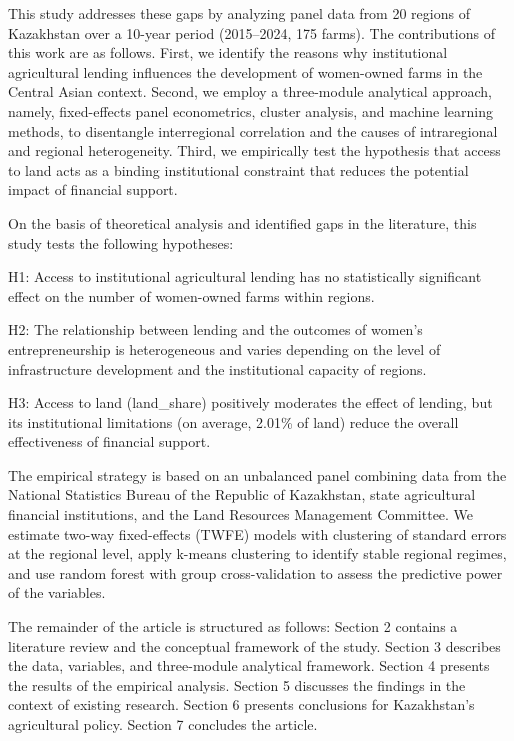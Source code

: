 \documentclass[
]{article}
\begin{document}
This study addresses these gaps by analyzing panel data from 20 regions
of Kazakhstan over a 10-year period (2015--2024, 175 farms). The
contributions of this work are as follows. First, we identify the
reasons why institutional agricultural lending influences the
development of women-owned farms in the Central Asian context. Second,
we employ a three-module analytical approach, namely, fixed-effects
panel econometrics, cluster analysis, and machine learning methods, to
disentangle interregional correlation and the causes of intraregional
and regional heterogeneity. Third, we empirically test the hypothesis
that access to land acts as a binding institutional constraint that
reduces the potential impact of financial support.

On the basis of theoretical analysis and identified gaps in the
literature, this study tests the following hypotheses:

H1: Access to institutional agricultural lending has no statistically
significant effect on the number of women-owned farms within regions.

H2: The relationship between lending and the outcomes of women's
entrepreneurship is heterogeneous and varies depending on the level of
infrastructure development and the institutional capacity of regions.

H3: Access to land (land\_share) positively moderates the effect of
lending, but its institutional limitations (on average, 2.01\% of land)
reduce the overall effectiveness of financial support.

The empirical strategy is based on an unbalanced panel combining data
from the National Statistics Bureau of the Republic of Kazakhstan, state
agricultural financial institutions, and the Land Resources Management
Committee. We estimate two-way fixed-effects (TWFE) models with
clustering of standard errors at the regional level, apply k-means
clustering to identify stable regional regimes, and use random forest
with group cross-validation to assess the predictive power of the
variables.

The remainder of the article is structured as follows: Section 2
contains a literature review and the conceptual framework of the study.
Section 3 describes the data, variables, and three-module analytical
framework. Section 4 presents the results of the empirical analysis.
Section 5 discusses the findings in the context of existing research.
Section 6 presents conclusions for Kazakhstan's agricultural policy.
Section 7 concludes the article.
\end{document}
